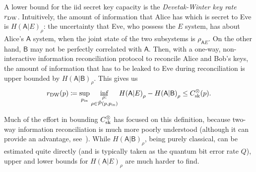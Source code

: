 \documentclass[10pt, a4paper]{article}
\numberwithin{equation}{section} %
\theoremstyle{definition}
\theoremstyle{plain}
\newcommand{\?}{\mathrel{?}} %
\newcommand{\crv}[1]{\mathsf{#1}}
\newcommand{\compatstates}[3][]{\hat{\mathcal{P}}#1(#2,#3)}
\newcommand{\prin}[1][p]{#1_{\mathrm{in}}}
\newcommand{\sk}{\rm sk}
\newcommand{\DW}{\rm DW}
\begin{document}
    A lower bound for the iid secret key capacity is the \emph{Devetak-Winter key rate}~\cite{DevetakWinter} \(r_{\DW}\). Intuitively, the amount of information that Alice has which is secret to Eve is \({H(\crv{A}|E)}_{\rho}\): the uncertainty that Eve, who possess the \(E\) system, has about Alice's \(\crv{A}\) system, when the joint state of the two subsystems is \(\rho_{\crv{A}E}\).  On the other hand, \(\crv{B}\) may not be perfectly correlated with \(\crv{A}\). Then, with a one-way, non-interactive information reconciliation protocol to reconcile Alice and Bob's keys, the amount of information that has to be leaked to Eve during reconciliation is upper bounded by \({H(\crv{A}|\crv{B})}_{\rho}\). This gives us
    \begin{equation}
      r_{\DW}(p) \coloneqq \sup_{\prin} \inf_{\substack{\rho : \\ \rho \in \compatstates{p}{\prin}}} {H(\crv{A}|E)}_{\rho} - {H(\crv{A}|\crv{B})}_{\rho} \leq C_{\sk}^{\otimes}(p).
    \end{equation}

    Much of the effort in bounding \(C_{\sk}^{\otimes}\) has focused on this definition, because two-way information reconciliation is much more poorly understood (although it can provide an advantage, see~\cite{AdvantageDistill}).  While \({H(\crv{A}|\crv{B})}_{\rho}\), being purely classical, can be estimated quite directly (and is typically taken as the quantum bit error rate \(Q\)), upper and lower bounds for \({H(\crv{A}|E)}_{\rho}\) are much harder to find.
\end{document}
